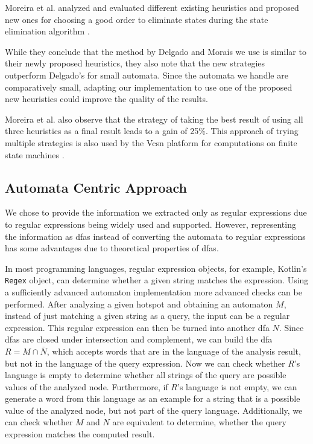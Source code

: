 Moreira et al. analyzed and evaluated different existing heuristics and proposed new ones for choosing a good order to eliminate states during the state elimination algorithm \cite{moreira_heuristics}.

While they conclude that the method by Delgado and Morais \cite{delgado} we use is similar to their newly proposed heuristics, they also note that the new strategies outperform Delgado's for small automata. Since the automata we handle are comparatively small, adapting our implementation to use one of the proposed new heuristics could improve the quality of the results.

Moreira et al. also observe that the strategy of taking the best result of using all three heuristics as a final result leads to a gain of 25\%. This approach of trying multiple strategies is also used by the Vcsn platform for computations on finite state machines \cite{vcsn}.

\subsection{Automata Centric Approach}

We chose to provide the information we extracted only as regular expressions due to regular expressions being widely used and supported.
However, representing the information as \acp{dfa} instead of converting the automata to regular expressions has some advantages due to theoretical properties of \acp{dfa}.

In most programming languages, regular expression objects, for example, Kotlin's \lstinline|Regex| object, can determine whether a given string matches the expression. Using a sufficiently advanced automaton implementation more advanced checks can be performed.
After analyzing a given hotspot and obtaining an automaton $M$, instead of just matching a given string as a query, the input can be a regular expression. This regular expression can then be turned into another \ac{dfa} $N$.
Since \acp{dfa} are closed under intersection and complement, we can build the \ac{dfa} $R = M \cap \overline{N}$, which accepts words that are in the language of the analysis result, but not in the language of the query expression.
Now we can check whether $R$'s language is empty to determine whether all strings of the query are possible values of the analyzed node. Furthermore, if $R$'s language is not empty, we can generate a word from this language as an example for a string that is a possible value of the analyzed node, but not part of the query language.
Additionally, we can check whether $M$ and $N$ are equivalent to determine, whether the query expression matches the computed result.


